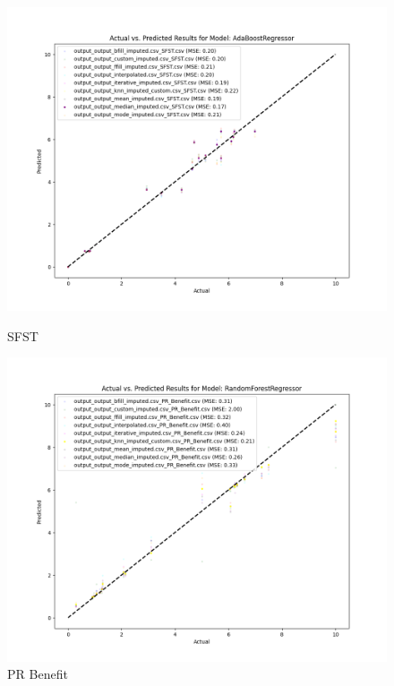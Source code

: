 \begin{figure}[H]
    \centering
    \begin{minipage}{0.495\textwidth}
        \centering
        \includegraphics[width=\linewidth]{reg_section_specific/images_reg_training/SFST_AdaBoostRegressor_plot.png}
        \caption{SFST}
        \label{fig_reg_spec:sfst_reg_training}
    \end{minipage}\hfill
    \begin{minipage}{0.495\textwidth}
        \centering
        \includegraphics[width=\linewidth]{reg_section_specific/images_reg_training/PR_Benefit_RandomForestRegressor_plot.png}
        \caption{PR Benefit}
        \label{fig_reg_spec:pr_ben_reg_training}
    \end{minipage}
\end{figure}

